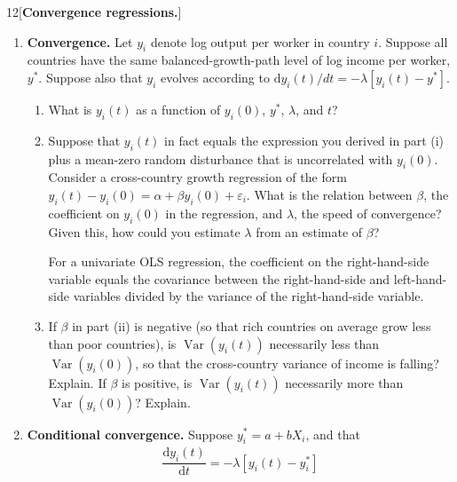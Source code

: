 \begin{problem}{12}[\textbf{Convergence regressions.}]
\begin{enumerate}[label=(\alph*)]
    \item \textbf{Convergence.} Let \(y_i\) denote log output per worker in country \(i\). Suppose all countries have the same balanced-growth-path level of log income per worker, \(y^*\). Suppose also that \(y_i\) evolves according to \(\text{d}y_i\left(t\right)/dt=-\lambda\left[y_i\left(t\right)-y^*\right]\).
    \begin{enumerate}[label=(\roman*)]
        \item What is \(y_i\left(t\right)\) as a function of \(y_i\left(0\right)\), \(y^*\), \(\lambda\), and \(t\)?
        \item Suppose that \(y_i\left(t\right)\) in fact equals the expression you derived in part (i) plus a mean-zero random disturbance that is uncorrelated with \(y_i\left(0\right)\). Consider a cross-country growth regression of the form \(y_i\left(t\right)-y_i\left(0\right)=\alpha+\beta y_i\left(0\right)+\varepsilon_i\). What is the relation between \(\beta\), the coefficient on \(y_i\left(0\right)\) in the regression, and \(\lambda\), the speed of convergence?  Given this, how could you estimate \(\lambda\) from an estimate of \(\beta\)?
        \par {} For a univariate OLS regression, the coefficient on the right-hand-side variable equals the covariance between the right-hand-side and left-hand-side variables divided by the variance of the right-hand-side variable.
        \item If \(\beta\) in part (ii) is negative (so that rich countries on average grow less than poor countries), is \(\operatorname{Var}\left(y_i\left(t\right)\right)\) necessarily less than \(\operatorname{Var}\left(y_i\left(0\right)\right)\), so that the cross-country variance of income is falling? Explain. If \(\beta\) is positive, is \(\operatorname{Var}\left(y_i\left(t\right)\right)\) necessarily more than \(\operatorname{Var}\left(y_i\left(0\right)\right)\)? Explain.
    \end{enumerate}
    \item \textbf{Conditional convergence.} Suppose \(y_i^*=a+bX_i\), and that
    \begin{align*}
        \dfrac{\text{d} y_i\left(t\right)}{\text{d} t}=-\lambda\left[y_i\left(t\right)-y_i^*\right]
    \end{align*}
    \begin{enumerate}[label=(\roman*)]

\end{enumerate}
\end{enumerate}
\end{problem}
